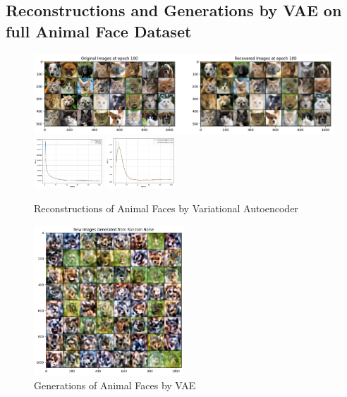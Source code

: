 \documentclass[10pt,a4paper]{article}
\begin{document}
\subsection*{Reconstructions and Generations by VAE on full Animal Face Dataset}

\begin{figure}[h]
    \centering
    \includegraphics[width=1\textwidth]{reconstructfull.png}
    \includegraphics[width=0.23\textwidth]{lossCurve.png}
    \includegraphics[width=0.23\textwidth]{klLoss.png}
    \caption{Reconstructions of Animal Faces by Variational Autoencoder}
    \label{fig:my_label}
\end{figure}

\begin{figure}
    \centering
    \includegraphics[width=0.5\textwidth]{generationFull.png}
    \caption{Generations of Animal Faces by VAE}
    \label{fig:my_label}
\end{figure} 
\end{document}
